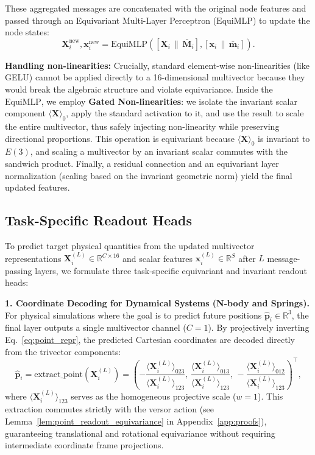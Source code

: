 \documentclass[10pt]{article}
\begin{document}
\noindent
These aggregated messages are concatenated with the original node features and passed through an Equivariant Multi-Layer Perceptron ($\mathrm{EquiMLP}$) to update the node states:
\begin{equation}
    \mathbf{X}_i^{\text{new}}, \mathbf{x}_i^{\text{new}} = \mathrm{EquiMLP}\left( [\mathbf{X}_i \,\|\, \bar{\mathbf{M}}_i], [\mathbf{x}_i \,\|\, \bar{\mathbf{m}}_i] \right).
    \label{eq:update}
\end{equation}

\noindent
\textbf{Handling non-linearities:} 
Crucially, standard element-wise non-linearities (like GELU) cannot be applied directly to a 16-dimensional multivector because they would break the algebraic structure and violate equivariance. 
Inside the $\mathrm{EquiMLP}$, we employ \textbf{Gated Non-linearities}: we isolate the invariant scalar component $\langle \mathbf{X} \rangle_0$, apply the standard activation to it, and use the result to scale the entire multivector, thus safely injecting non-linearity while preserving directional proportions.
This operation is equivariant because $\langle \mathbf{X} \rangle_0$ is invariant to $E(3)$, and scaling a multivector by an invariant scalar commutes with the sandwich product. 
Finally, a residual connection and an equivariant layer normalization (scaling based on the invariant geometric norm) yield the final updated features.

\subsection{Task-Specific Readout Heads}
\label{subsec:readout}

To predict target physical quantities from the updated multivector representations $\mathbf{X}_i^{(L)} \in \mathbb{R}^{C \times 16}$ and scalar features $\mathbf{x}_i^{(L)} \in \mathbb{R}^{S}$ after $L$ message-passing layers, we formulate three task-specific equivariant and invariant readout heads:

\noindent\textbf{1. Coordinate Decoding for Dynamical Systems (N-body and Springs).}
For physical simulations where the goal is to predict future positions $\hat{\mathbf{p}}_i \in \mathbb{R}^3$, the final layer outputs a single multivector channel ($C=1$). By projectively inverting Eq.~\ref{eq:point_repr}, the predicted Cartesian coordinates are decoded directly from the trivector components:
\begin{equation}
    \hat{\mathbf{p}}_i = \mathrm{extract\_point}\left(\mathbf{X}_i^{(L)}\right) = \left( -\frac{\langle \mathbf{X}_i^{(L)} \rangle_{023}}{\langle \mathbf{X}_i^{(L)} \rangle_{123}},\, \frac{\langle \mathbf{X}_i^{(L)} \rangle_{013}}{\langle \mathbf{X}_i^{(L)} \rangle_{123}},\, -\frac{\langle \mathbf{X}_i^{(L)} \rangle_{012}}{\langle \mathbf{X}_i^{(L)} \rangle_{123}} \right)^\top,
    \label{eq:extract_point}
\end{equation}
where $\langle \mathbf{X}_i^{(L)} \rangle_{123}$ serves as the homogeneous projective scale ($w=1$). This extraction commutes strictly with the versor action (see Lemma~\ref{lem:point_readout_equivariance} in Appendix~\ref{app:proofs}), guaranteeing translational and rotational equivariance without requiring intermediate coordinate frame projections.
\end{document}
